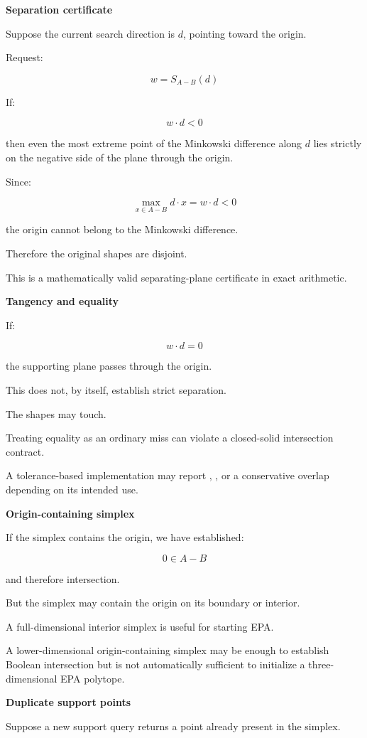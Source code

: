 \textbf{Separation certificate}

Suppose the current search direction is \(d\), pointing toward the origin.

Request:

\[
w=S_{A-B}(d)
\]

If:

\[
\boxed{ w\cdot d<0 }
\]

then even the most extreme point of the Minkowski difference along \(d\) lies strictly on the negative side of the plane through the origin.

Since:

\[
\max_{x\in A-B}d\cdot x=w\cdot d<0
\]

the origin cannot belong to the Minkowski difference.

Therefore the original shapes are disjoint.

This is a mathematically valid separating-plane certificate in exact arithmetic.

\textbf{Tangency and equality}

If:

\[
w\cdot d=0
\]

the supporting plane passes through the origin.

This does not, by itself, establish strict separation.

The shapes may touch.

Treating equality as an ordinary miss can violate a closed-solid intersection contract.

A tolerance-based implementation may report , , or a conservative overlap depending on its intended use.

\textbf{Origin-containing simplex}

If the simplex contains the origin, we have established:

\[
0\in A-B
\]

and therefore intersection.

But the simplex may contain the origin on its boundary or interior.

A full-dimensional interior simplex is useful for starting EPA.

A lower-dimensional origin-containing simplex may be enough to establish Boolean intersection but is not automatically sufficient to initialize a three-dimensional EPA polytope.

\textbf{Duplicate support points}

Suppose a new support query returns a point already present in the simplex.


